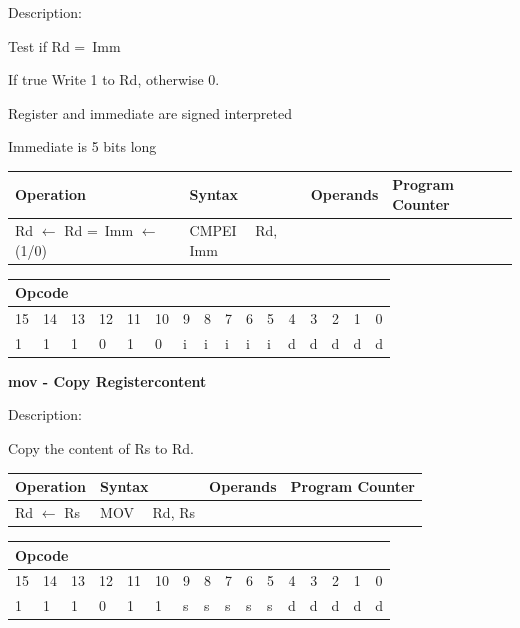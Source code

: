 \documentclass[%
	pdftex,
	a4paper,
	oneside,
	bibtotoc,%
	idxtotoc,%
	bibtotocnumbered,
	halfparskip,%
]{scrbook}
\begin{document}
Description:

Test if Rd =\ Imm

If true Write 1 to Rd, otherwise 0.

Register and immediate are signed interpreted

Immediate is 5 bits long

\begin{tabular}{|l|l|l|l|}
\hline
Operation & Syntax & Operands & Program Counter \\ \hline
Rd $\leftarrow $ Rd =\ Imm $\leftarrow $ (1/0) & CMPEI \ \ Rd, Imm &  &  \\ 
\hline
\end{tabular}

\begin{tabular}{|c|c|c|c|c|c|c|c|c|c|c|c|c|c|c|c|}
\hline
\multicolumn{6}{|l|}{Opcode} & \multicolumn{5}{|l|}{} & \multicolumn{5}{|l|}{
} \\ \hline
15 & 14 & 13 & 12 & 11 & 10 & 9 & 8 & 7 & 6 & 5 & 4 & 3 & 2 & 1 & 0 \\ \hline
\multicolumn{1}{|l|}{1} & \multicolumn{1}{|l|}{1} & \multicolumn{1}{|l|}{1}
& \multicolumn{1}{|l|}{0} & \multicolumn{1}{|l|}{1} & \multicolumn{1}{|l|}{0}
& \multicolumn{1}{|l|}{i} & \multicolumn{1}{|l|}{i} & \multicolumn{1}{|l|}{i}
& \multicolumn{1}{|l|}{i} & \multicolumn{1}{|l|}{i} & \multicolumn{1}{|l|}{d}
& \multicolumn{1}{|l|}{d} & \multicolumn{1}{|l|}{d} & \multicolumn{1}{|l|}{d}
& \multicolumn{1}{|l|}{d} \\ \hline
\end{tabular}

\bigskip

\textbf{mov - Copy Registercontent}

Description:

Copy the content of Rs to Rd.

\begin{tabular}{|l|l|l|l|}
\hline
Operation & Syntax & Operands & Program Counter \\ \hline
Rd $\leftarrow $ Rs & MOV \ \ Rd, Rs &  &  \\ \hline
\end{tabular}

\begin{tabular}{|c|c|c|c|c|c|c|c|c|c|c|c|c|c|c|c|}
\hline
\multicolumn{6}{|l|}{Opcode} & \multicolumn{5}{|l|}{} & \multicolumn{5}{|l|}{
} \\ \hline
15 & 14 & 13 & 12 & 11 & 10 & 9 & 8 & 7 & 6 & 5 & 4 & 3 & 2 & 1 & 0 \\ \hline
\multicolumn{1}{|l|}{1} & \multicolumn{1}{|l|}{1} & \multicolumn{1}{|l|}{1}
& \multicolumn{1}{|l|}{0} & \multicolumn{1}{|l|}{1} & \multicolumn{1}{|l|}{1}
& \multicolumn{1}{|l|}{s} & \multicolumn{1}{|l|}{s} & \multicolumn{1}{|l|}{s}
& \multicolumn{1}{|l|}{s} & \multicolumn{1}{|l|}{s} & \multicolumn{1}{|l|}{d}
& \multicolumn{1}{|l|}{d} & \multicolumn{1}{|l|}{d} & \multicolumn{1}{|l|}{d}
& \multicolumn{1}{|l|}{d} \\ \hline
\end{tabular}
\end{document}
